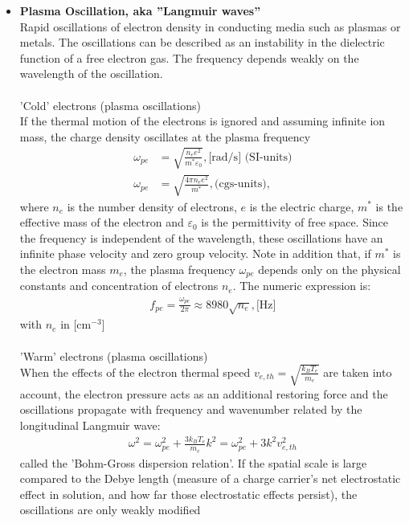 \begin{itemize}
\item \textbf{Plasma Oscillation, aka ''Langmuir waves''} \\
Rapid oscillations of electron density in conducting media such as plasmas or metals.
The oscillations can be described as an instability in the dielectric function of a free electron gas.
The frequency depends weakly on the wavelength of the oscillation.
\\
\\
'Cold' electrons (plasma oscillations)\\
If the thermal motion of the electrons is ignored and assuming infinite ion mass,
the charge density oscillates at the plasma frequency
\begin{align}
   \omega_{pe} &= \sqrt{\frac{n_e e^2}{m^* \varepsilon_0}}, \text{[rad/s] (SI-units)} \\
   \omega_{pe} &= \sqrt{\frac{4 \pi n_e e^2}{m^*}}, \text{(cgs-units)},
\end{align}
where $n_e$ is the number density of electrons, $e$ is the electric charge, $m^*$ is the effective mass of
the electron and $\varepsilon_0$ is the permittivity of free space. Since the frequency is independent of 
the wavelength, these oscillations have an infinite phase velocity and zero group velocity.
Note in addition that, if $m^*$ is the electron mass $m_e$, the plasma frequency $\omega_{pe}$
depends only on the physical constants and concentration of electrons $n_e$. The numeric expression is:
\begin{align}
f_{pe} = \frac{\omega_{pe}}{2 \pi} \approx 8980 \sqrt{n_e}, \text{[Hz]}
\end{align}
with $n_e$ in [cm$^{-3}$]
\\
\\
'Warm' electrons (plasma oscillations)\\
When the effects of the electron thermal speed $v_{e,th} = \sqrt{\frac{k_B T_e}{m_e}}$ are taken into account,
the electron pressure acts as an additional restoring force and the oscillations propagate with
frequency and wavenumber related by the longitudinal Langmuir wave:
\begin{align}
\omega ^2 = \omega_{pe} ^2 + \frac{3 k_B T_e}{m_e} k^2 = \omega_{pe} ^2 + 3k^2 v_{e,th}^2
\end{align}
called the 'Bohm-Gross dispersion relation'. If the spatial scale is large compared to
the Debye length (measure of a charge carrier's net electrostatic effect in solution, 
and how far those electrostatic effects persist), the oscillations are only weakly modified

\end{itemize}
